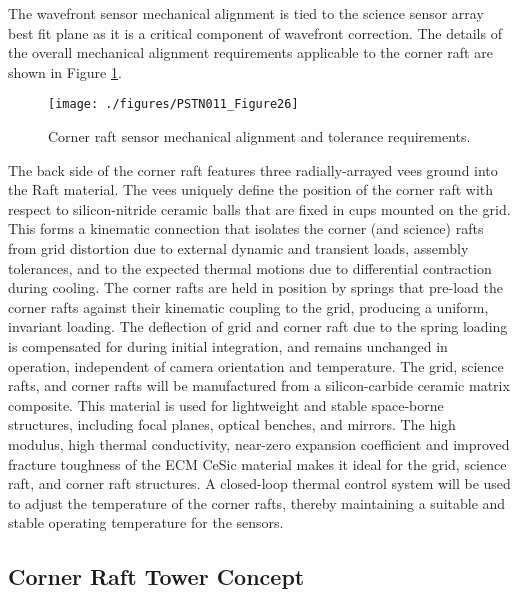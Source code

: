 The wavefront sensor mechanical alignment is tied to the science sensor array best fit plane as it is a
critical component of wavefront correction. The details of the overall mechanical alignment
requirements applicable to the corner raft are shown in Figure \ref{fig:Fig26}.

\begin{figure}[htbp]
\begin{center}
\texttt{[image: ./figures/PSTN011\_Figure26]}
\caption{Corner raft sensor mechanical alignment and tolerance requirements.}
\label{fig:Fig26}
\end{center}
\end{figure}

The back side of the corner raft features three radially-arrayed vees ground into the Raft material. The
vees uniquely define the position of the corner raft with respect to silicon-nitride ceramic balls that are
fixed in cups mounted on the grid. This forms a kinematic connection that isolates the corner (and
science) rafts from grid distortion due to external dynamic and transient loads, assembly tolerances, and
to the expected thermal motions due to differential contraction during cooling. The corner rafts are
held in position by springs that pre-load the corner rafts against their kinematic coupling to the grid,
producing a uniform, invariant loading. The deflection of grid and corner raft due to the spring loading is
compensated for during initial integration, and remains unchanged in operation, independent of camera
orientation and temperature.
The grid, science rafts, and corner rafts will be manufactured from a silicon-carbide ceramic matrix
composite. This material is used for lightweight and stable space-borne structures, including focal
planes, optical benches, and mirrors. The high modulus, high thermal conductivity, near-zero expansion
coefficient and improved fracture toughness of the ECM CeSic material makes it ideal for the grid,
science raft, and corner raft structures. A closed-loop thermal control system will be used to adjust the
temperature of the corner rafts, thereby maintaining a suitable and stable operating temperature for
the sensors.

\subsection{Corner Raft Tower Concept}

